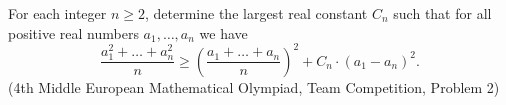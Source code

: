 For each integer $n\geqslant2$,  determine the largest real constant $C_n$ such that for all positive real numbers $a_1, \ldots, a_n$ we have\[\frac{a_1^2+\ldots+a_n^2}{n}\geqslant\left(\frac{a_1+\ldots+a_n}{n}\right)^2+C_n\cdot(a_1-a_n)^2\mbox{.}\](4th Middle European Mathematical Olympiad, Team Competition, Problem 2)